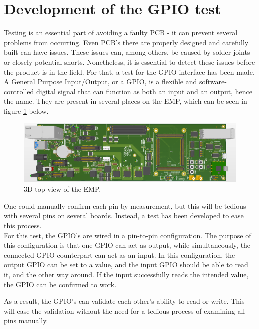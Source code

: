 \section{Development of the GPIO test}

Testing is an essential part of avoiding a faulty PCB - it can prevent several problems from occurring. Even PCB's there are properly designed and carefully built can have issues. These issues can, among others, be caused by solder joints or closely potential shorts. Nonetheless, it is essential to detect these issues before the product is in the field. For that, a test for the GPIO interface has been made. \\

\noindent A General Purpose Input/Output, or a GPIO, is a flexible and software-controlled digital signal that can function as both an input and an output, hence the name. They are present in several places on the EMP, which can be seen in figure \ref{fig:altiumEMP} below. 

\begin{figure}[H]
    \centering
    \includegraphics[width=1\textwidth]{Graphics/EMP_3d.PNG}
    \caption{3D top view of the EMP.}
    \label{fig:altiumEMP}
\end{figure}

\noindent One could manually confirm each pin by measurement, but this will be tedious with several pins on several boards. Instead, a test has been developed to ease this process.\\

\noindent For this test, the GPIO's are wired in a pin-to-pin configuration. The purpose of this configuration is that one GPIO can act as output, while simultaneously, the connected GPIO counterpart can act as an input. In this configuration, the output GPIO can be set to a value, and the input GPIO should be able to read it, and the other way around. If the input successfully reads the intended value, the GPIO can be confirmed to work.

As a result, the GPIO's can validate each other's ability to read or write. This will ease the validation without the need for a tedious process of examining all pins manually.

